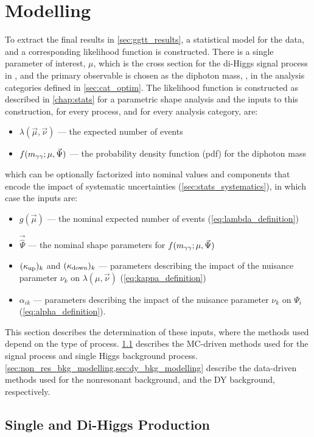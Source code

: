 \section{Modelling}\label{sec:ggtt_modelling}
To extract the final results in \cref{sec:ggtt_results}, a statistical model for the data, and a corresponding likelihood function is constructed. There is a single parameter of interest, $\mu$, which is the cross section for the di-Higgs signal process in \fb, and the primary observable is chosen as the diphoton mass, \mgg, in the analysis categories defined in \cref{sec:cat_optim}. The likelihood function is constructed as described in \cref{chap:stats} for a parametric shape analysis and the inputs to this construction, for every process, and for every analysis category, are:
\begin{itemize}
  \item $\lambda(\vec{\mu},\vec{\nu})$ --- the expected number of events
  \item $f(m_{\gamma\gamma};\mu,\vec{\Psi})$ --- the probability density function (pdf) for the diphoton mass
\end{itemize}
which can be optionally factorized into nominal values and components that encode the impact of systematic uncertainties (\cref{sec:stats_systematics}), in which case the inputs are:
\begin{itemize}
  \item $g(\vec{\mu})$ --- the nominal expected number of events (\cref{eq:lambda_definition})
  \item $\vec{\hat{\Psi}}$ --- the nominal shape parameters for $f(m_{\gamma\gamma};\mu,\vec{\Psi})$ 
  \item $(\kappa_{\text{up}})_k$ and $(\kappa_{\text{down}})_k$ --- parameters describing the impact of the nuisance parameter $\nu_k$ on $\lambda(\mu,\vec{\nu})$ (\cref{eq:kappa_definition})
  \item $\alpha_{ik}$ --- parameters describing the impact of the nuisance parameter $\nu_k$ on $\Psi_i$ (\cref{eq:alpha_definition}).
\end{itemize}
This section describes the determination of these inputs, where the methods used depend on the type of process. \cref{sec:h_hh_modelling} describes the MC-driven methods used for the signal process and single Higgs background process. \cref{sec:non_res_bkg_modelling,sec:dy_bkg_modelling} describe the data-driven methods used for the nonresonant background, and the DY background, respectively.

\subsection{Single and Di-Higgs Production}\label{sec:h_hh_modelling}

